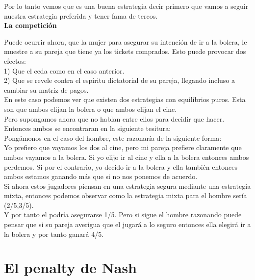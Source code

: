 \documentclass[10pt,a4paper]{book}
\begin{document}
Por lo tanto vemos que es una buena estrategia decir primero que vamos a seguir nuestra estrategia preferida y tener fama de tercos.\\


\textbf{La competición}

Puede ocurrir ahora, que la mujer para asegurar su intención de ir a la bolera, le muestre a su pareja que tiene ya los tickets comprados. Esto puede provocar dos efectos:\\

1) Que el ceda como en el caso anterior.\\
2) Que se revele contra el espíritu dictatorial de su pareja, llegando incluso a cambiar su matriz de pagos.\\

En este caso podemos ver que existen dos estrategias con equilibrios puros. Esta son que ambos elijan la bolera o que ambos elijan el cine. \\

Pero supongamos ahora que no hablan entre ellos para decidir que hacer.\\
Entonces ambos se encontraran en la siguiente tesitura:\\

Pongámonos en el caso del hombre, este razonaría de la siguiente forma:\\

Yo prefiero que vayamos los dos al cine, pero mi pareja prefiere claramente que ambos vayamos a la bolera. Si yo elijo ir al cine y ella a la bolera entonces ambos perdemos. Si por el contrario, yo decido ir a la bolera y ella también entonces ambos estamos ganando más que si no nos ponemos de acuerdo.\\

Si ahora estos jugadores piensan en una estrategia segura mediante una estrategia mixta, entonces podemos observar como la estrategia mixta para el hombre sería (2/5,3/5).\\

Y por tanto el podría asegurarse 1/5. Pero si sigue el hombre razonando puede pensar que si su pareja averigua que el jugará a lo seguro entonces ella elegirá ir a la bolera y por tanto ganará 4/5. \\



\section{El penalty de Nash}
\end{document}
